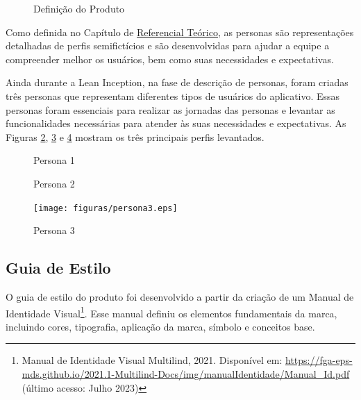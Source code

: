 \begin{figure}[h!]
	\centering
	\caption{Definição do Produto}
	\label{fig12}
\end{figure}

Como definida no Capítulo de \hyperref[chap:Referencial]{Referencial Teórico}, as personas são representações detalhadas de perfis semifictícios e são desenvolvidas para ajudar a equipe a compreender melhor os usuários, bem como suas 
necessidades e expectativas. 

Ainda durante a Lean Inception, na fase de descrição de personas, foram criadas três personas que representam diferentes tipos de usuários do aplicativo. Essas personas foram essenciais para realizar as jornadas das personas e levantar as funcionalidades necessárias para atender às 
suas necessidades e expectativas. As Figuras \ref{fig13}, \ref{fig14} e \ref{fig15} mostram os três principais perfis levantados.

\begin{figure}[h!]
	\centering
	\caption{Persona 1}
	\label{fig13}
\end{figure}

\begin{figure}[h!]
	\centering
	\caption{Persona 2}
	\label{fig14}
\end{figure}

\begin{figure}[h!]
	\centering
	\begin{adjustbox}{center}
		\texttt{[image: figuras/persona3.eps]}
	\end{adjustbox}
	\caption{Persona 3}
	\label{fig15}
\end{figure}

\subsection{Guia de Estilo}
\label{Guia de Estilo}
O guia de estilo do produto foi desenvolvido a partir da criação de um Manual de Identidade Visual\footnote{Manual de Identidade Visual Multilind, 2021. Disponível
em: \url{https://fga-eps-mds.github.io/2021.1-Multilind-Docs/img/manualIdentidade/Manual_Id.pdf} (último acesso: Julho 2023)}. Esse manual definiu os elementos fundamentais da marca, incluindo cores, tipografia, aplicação da marca, símbolo e conceitos base.

